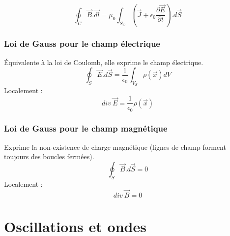\documentclass[british,french,11pt, a4paper, openany]{book}
\begin{document}
	\begin{equation}
		\oint_C \vec{B}.\vec{dl} = \mu_0   \int_{S_C}\left(\vec{J} + \epsilon_0 \frac{\partial \vec{E}}{\partial t}\right).d\vec{S}
	\end{equation}
	
	\subsection{Loi de Gauss pour le champ électrique}
	Équivalente à la loi de Coulomb, elle exprime le champ électrique.
	\begin{equation}
		\oint_S \vec{E}.d\vec{S} = \frac{1}{\epsilon_0}\int_{V_S} \rho(\vec{x})dV
	\end{equation}
	Localement :
	\begin{equation}
		div\ \vec{E} = \frac{1}{\epsilon_0}\rho(\vec{x})
	\end{equation}
	
	\subsection{Loi de Gauss pour le champ magnétique}
	Exprime la non-existence de charge magnétique (lignes de champ forment toujours des boucles fermées).
	\begin{equation}
		\oint_S \vec{B}.d\vec{S} = 0
	\end{equation}
	Localement :
	\begin{equation}
		div\ \vec{B} = 0
	\end{equation}
	
	
	
	
	
	
	
	
	
	
	
	
	
	
	
	
	
	
	
	
	
	
	
	
	
	
	
	
	
	
	
	
	
	
	
	
	
	
	\chapter{Oscillations et ondes}
\end{document}
